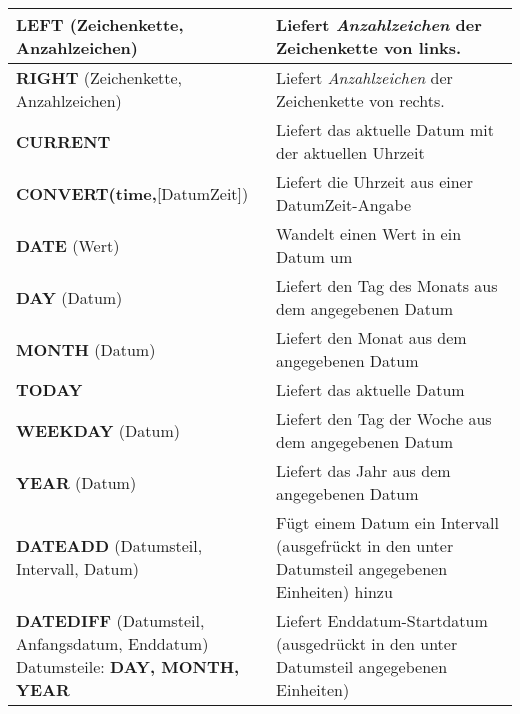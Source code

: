 \begin{center}
\begin{tabular}{|p{} | p{}|}
		\hline
		\textbf{LEFT} (Zeichenkette, Anzahlzeichen) & Liefert \textit{Anzahlzeichen} der Zeichenkette von links.\\
		\hline
		\textbf{RIGHT} (Zeichenkette, Anzahlzeichen) & Liefert \textit{Anzahlzeichen} der Zeichenkette von rechts.\\
		\hline
		\textbf{CURRENT} & Liefert das aktuelle Datum mit der aktuellen Uhrzeit\\
		\hline
		\textbf{CONVERT(time,}[DatumZeit]) & Liefert die Uhrzeit aus einer DatumZeit-Angabe\\
		\hline
		\textbf{DATE} (Wert) & Wandelt einen Wert in ein Datum um\\
		\hline
		\textbf{DAY} (Datum) & Liefert den Tag des Monats aus dem angegebenen Datum\\
		\hline
		\textbf{MONTH} (Datum) & Liefert den Monat aus dem angegebenen Datum\\
		\hline
		\textbf{TODAY} & Liefert das aktuelle Datum\\
		\hline
		\textbf{WEEKDAY} (Datum) & Liefert den Tag der Woche aus dem angegebenen Datum\\
		\hline
		\textbf{YEAR} (Datum) & Liefert das Jahr aus dem angegebenen Datum\\
		\hline
		\textbf{DATEADD} (Datumsteil, Intervall, Datum) & Fügt einem Datum ein Intervall (ausgefrückt in den unter Datumsteil angegebenen Einheiten) hinzu\\
		\hline
		\textbf{DATEDIFF} (Datumsteil, Anfangsdatum, Enddatum) Datumsteile: \textbf{DAY, MONTH, YEAR} & Liefert Enddatum-Startdatum (ausgedrückt in den unter Datumsteil angegebenen Einheiten)\\
		\hline
	\end{tabular}
\end{center}

